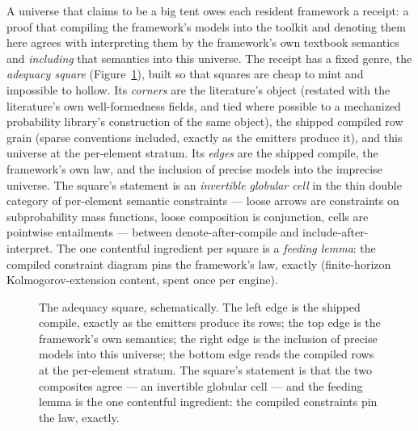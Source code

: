 A universe that claims to be a big tent owes each resident framework
a receipt: a proof that compiling the framework's models into the
toolkit and denoting them here agrees with interpreting them by the
framework's own textbook semantics and \emph{including} that
semantics into this universe. The receipt has a fixed genre, the
\emph{adequacy square} (Figure~\ref{fig:su-adequacy-square}), built so
that squares are cheap to mint and impossible to hollow. Its
\emph{corners} are the literature's object (restated with the
literature's own well-formedness fields, and tied where possible to
a mechanized probability library's construction of the same
object), the shipped compiled row grain (sparse conventions
included, exactly as the emitters produce it), and this universe at
the per-element stratum. Its \emph{edges} are the shipped compile,
the framework's own law, and the inclusion of precise models into
the imprecise universe. The square's statement is an
\emph{invertible globular cell} in the thin double category of
per-element semantic constraints --- loose arrows are constraints
on subprobability mass functions, loose composition is conjunction,
cells are pointwise entailments --- between denote-after-compile
and include-after-interpret. The one contentful ingredient per
square is a \emph{feeding lemma}: the compiled constraint diagram
pins the framework's law, exactly (finite-horizon
Kolmogorov-extension content, spent once per engine).

\begin{figure}[t]
\centering
{}
\caption{The adequacy square, schematically. The left edge is the
shipped compile, exactly as the emitters produce its rows; the top
edge is the framework's own semantics; the right edge is the
inclusion of precise models into this universe; the bottom edge
reads the compiled rows at the per-element stratum. The square's
statement is that the two composites agree --- an invertible
globular cell --- and the feeding lemma is the one contentful
ingredient: the compiled constraints pin the law, exactly.}
\label{fig:su-adequacy-square}
\end{figure}

